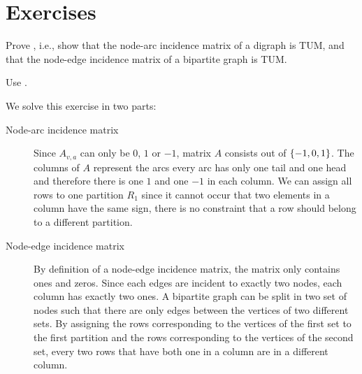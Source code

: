 \section*{Exercises}
\begin{exercise}
Prove , i.e., show that the node-arc incidence matrix of a digraph is TUM, and that the node-edge incidence matrix of a bipartite graph is TUM.
\begin{hint}
Use .
\end{hint}
\begin{answer}We solve this exercise in two parts:
\begin{description}
 \item [Node-arc incidence matrix] Since $A_{v,a}$ can only be $0$, $1$ or $-1$, matrix $A$ consists out of $\left\{ -1,0,1 \right\}$. The columns of $A$ represent the arcs every arc has only one tail and one head and therefore there is one $1$ and one $-1$ in each column. We can assign all rows to one partition $R_1$ since it cannot occur that two elements in a column have the same sign, there is no constraint that a row should belong to a different partition.
 \item [Node-edge incidence matrix] By definition of a node-edge incidence matrix, the matrix only contains ones and zeros. Since each edges are incident to exactly two nodes, each column has exactly two ones. A bipartite graph can be split in two set of nodes such that there are only edges between the vertices of two different sets. By assigning the rows corresponding to the vertices of the first set to the first partition and the rows corresponding to the vertices of the second set, every two rows that have both one in a column are in a different column.
\end{description}
\end{answer}
\end{exercise}
